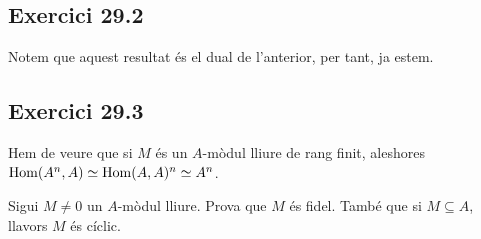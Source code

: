 \documentclass[11pt, a4paper]{article}
\begin{document}
\subsection{Exercici 29.2}
Notem que aquest resultat és el dual de l'anterior, per tant, ja estem.
\subsection{Exercici 29.3}
Hem de veure que si $M$ és un $A$-mòdul lliure de rang finit, aleshores $\mathrm{Hom}(A^n,A)\simeq \mathrm{Hom}(A,A)^n\simeq A^n$.
\newpage
\begin{tcolorbox}[title=\section{Exercici 30}]
    Sigui $M\neq0$ un $A$-mòdul lliure. Prova que $M$ és fidel. També que si $M\subseteq A$, llavors $M$ és cíclic.
\end{tcolorbox}
\end{document}
